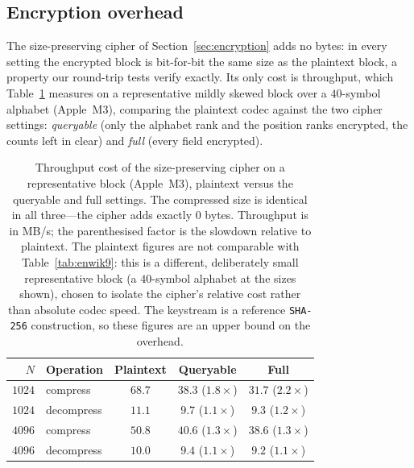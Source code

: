\documentclass[entropy,article,submit,oneauthor,pdftex]{Definitions/mdpi}
\begin{document}
\subsection{Encryption overhead}\label{sec:encexp}
The size-preserving cipher of Section~\ref{sec:encryption} adds no bytes: in every
setting the encrypted block is bit-for-bit the same size as the plaintext block, a
property our round-trip tests verify exactly. Its only cost is throughput, which
Table~\ref{tab:encryption} measures on a representative mildly skewed block over a
$40$-symbol alphabet (Apple~M3), comparing the plaintext codec against the two cipher
settings: \emph{queryable} (only the alphabet rank and the position ranks encrypted,
the counts left in clear) and \emph{full} (every field encrypted).

\begin{table}[ht]
\centering
\renewcommand{\arraystretch}{1.15}
\caption{Throughput cost of the size-preserving cipher on a representative block
(Apple~M3), plaintext versus the queryable and full settings. The compressed size is
identical in all three---the cipher adds exactly $0$ bytes. Throughput is in MB/s;
the parenthesised factor is the slowdown relative to plaintext. The plaintext figures
are not comparable with Table~\ref{tab:enwik9}: this is a different, deliberately small
representative block (a $40$-symbol alphabet at the sizes shown), chosen to isolate the
cipher's relative cost rather than absolute codec speed. The keystream is a
reference \texttt{SHA-256} construction, so these figures are an upper bound on the
overhead.}
\begin{tabular}{r l c c c}
\toprule
\textbf{$N$} & \textbf{Operation} & \textbf{Plaintext} & \textbf{Queryable} & \textbf{Full} \\
\midrule
$1024$ & compress   & $68.7$ & $38.3$ ($1.8\times$) & $31.7$ ($2.2\times$) \\
$1024$ & decompress & $11.1$ & $9.7$ ($1.1\times$)  & $9.3$ ($1.2\times$)  \\
$4096$ & compress   & $50.8$ & $40.6$ ($1.3\times$) & $38.6$ ($1.3\times$) \\
$4096$ & decompress & $10.0$ & $9.4$ ($1.1\times$)  & $9.2$ ($1.1\times$)  \\
\bottomrule
\end{tabular}
\label{tab:encryption}
\end{table}
\end{document}
